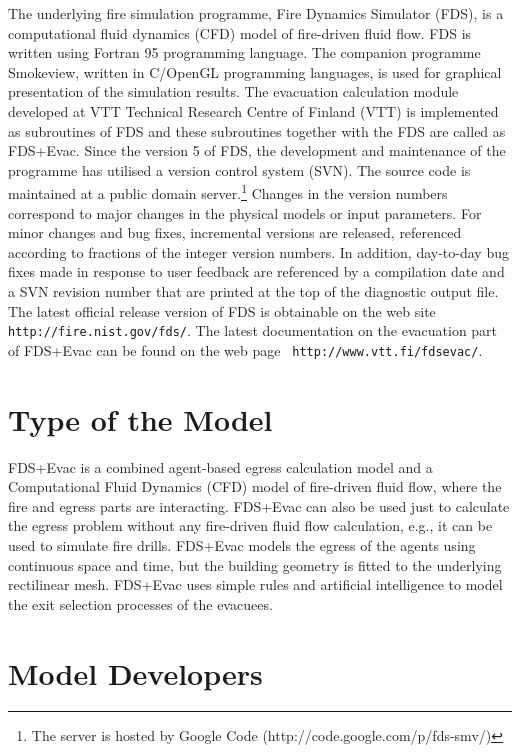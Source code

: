 \documentclass[12pt,a4paper,final,twoside]{stylevk}
\begin{document}
\noindent The underlying fire simulation programme, Fire Dynamics
Simulator (FDS), is a computational fluid dynamics (CFD) model of
fire-driven fluid flow.  FDS is written using Fortran 95 programming
language.  The companion programme Smokeview, written in C/OpenGL
programming languages, is used for graphical presentation of the
simulation results.  The evacuation calculation module developed at
VTT Technical Research Centre of Finland (VTT) is implemented as
subroutines of FDS and these subroutines together with the FDS are
called as FDS+Evac.  Since the version 5 of FDS, the development and
maintenance of the programme has utilised a version control system
(SVN).  The source code is maintained at a public domain
server.\footnote{The server is hosted by Google Code
  (http://code.google.com/p/fds-smv/)} Changes in the version numbers
correspond to major changes in the physical models or input
parameters.  For minor changes and bug fixes, incremental versions are
released, referenced according to fractions of the integer version
numbers.  In addition, day-to-day bug fixes made in response to user
feedback are referenced by a compilation date and a SVN revision
number that are printed at the top of the diagnostic output file.  The
latest official release version of FDS is obtainable on the web site
{\tt http://fire.nist.gov/fds/}.  The latest documentation on the
evacuation part of FDS+Evac can be found on the web page {\tt
  http://www.vtt.fi/fdsevac/}.


\section{Type of the Model}

\noindent FDS+Evac is a combined agent-based egress calculation model
and a Computational Fluid Dynamics (CFD) model of fire-driven fluid
flow, where the fire and egress parts are interacting.  FDS+Evac can
also be used just to calculate the egress problem without any
fire-driven fluid flow calculation, e.g., it can be used to
simulate fire drills.  FDS+Evac models the egress of the agents using
continuous space and time, but the building geometry is fitted to the
underlying rectilinear mesh.  FDS+Evac uses simple rules and
artificial intelligence to model the exit selection processes of the
evacuees.


\section{Model Developers}
\end{document}
